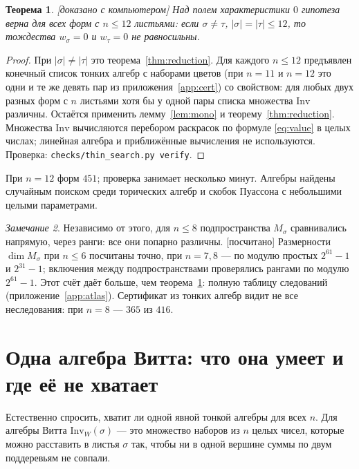 \documentclass[11pt]{article}
\newcommand{\Inv}{\mathrm{Inv}}
\newcommand{\stat}[1]{\textsf{\small[#1]}}
\newcommand{\comproved}{\stat{доказано с компьютером}}
\newcommand{\computed}{\stat{посчитано}}
\theoremstyle{plain}
\newtheorem{theorem}{Теорема}
\theoremstyle{definition}
\theoremstyle{remark}
\newtheorem{remark}[theorem]{Замечание}
\begin{document}
\begin{theorem}\label{thm:n12} \comproved{}
Над полем характеристики $0$ гипотеза верна для всех форм с $n\le12$ листьями: если $\sigma\ne\tau$, $|\sigma|=|\tau|\le12$, то тождества $w_\sigma=0$ и $w_\tau=0$ не равносильны.
\end{theorem}
\begin{proof}
При $|\sigma|\ne|\tau|$ это теорема~\ref{thm:reduction}. Для каждого $n\le12$ предъявлен конечный список тонких алгебр с наборами цветов (при $n=11$ и $n=12$ это одни и те же девять пар из приложения~\ref{app:cert}) со свойством: для любых двух разных форм с $n$ листьями хотя бы у одной пары списка множества $\Inv$ различны. Остаётся применить лемму~\ref{lem:mono} и теорему~\ref{thm:reduction}. Множества $\Inv$ вычисляются перебором раскрасок по формуле \eqref{eq:value} в целых числах; линейная алгебра и приближённые вычисления не используются. Проверка: \texttt{checks/thin\_search.py verify}.
\end{proof}

При $n=12$ форм $451$; проверка занимает несколько минут. Алгебры найдены случайным поиском среди торических алгебр и скобок Пуассона с небольшими целыми параметрами.

\begin{remark}
Независимо от этого, для $n\le8$ подпространства $M_\sigma$ сравнивались напрямую, через ранги: все они попарно различны. \computed{} Размерности $\dim M_\sigma$ при $n\le6$ посчитаны точно, при $n=7,8$ --- по модулю простых $2^{61}-1$ и $2^{31}-1$; включения между подпространствами проверялись рангами по модулю $2^{61}-1$. Этот счёт даёт больше, чем теорема~\ref{thm:n12}: полную таблицу следований (приложение~\ref{app:atlas}). Сертификат из тонких алгебр видит не все неследования: при $n=8$ --- $365$ из $416$.
\end{remark}

\section{Одна алгебра Витта: что она умеет и где её не хватает}\label{sec:witt}

Естественно спросить, хватит ли одной явной тонкой алгебры для всех $n$. Для алгебры Витта $\Inv_W(\sigma)$ --- это множество наборов из $n$ целых чисел, которые можно расставить в листья $\sigma$ так, чтобы ни в одной вершине суммы по двум поддеревьям не совпали.
\end{document}
